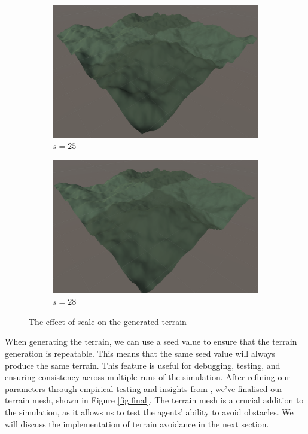 \documentclass[12pt]{article}
\begin{document}
\begin{figure}[ht]
    \centering
    \begin{subfigure}{0.45\textwidth}
        \centering
        \includegraphics[width=\linewidth]{scale25.png}
        \caption{$s=25$}
        \label{fig:scale25}
    \end{subfigure}
    \hfill
    \begin{subfigure}{0.45\textwidth}
        \centering
        \includegraphics[width=\linewidth]{scale28.png}
        \caption{$s=28$}
        \label{fig:scale28}
    \end{subfigure}
    \caption{The effect of scale on the generated terrain}
    \label{fig:scale}
\end{figure}

When generating the terrain, we can use a seed value to ensure that the terrain generation is repeatable. This means that the same seed value will always produce the same terrain. This feature is useful for debugging, testing, and ensuring consistency across multiple runs of the simulation. After refining our parameters through empirical testing and insights from \cite[pg.3-4]{Etherington}, we've finalised our terrain mesh, shown in Figure \ref{fig:final}. The terrain mesh is a crucial addition to the simulation, as it allows us to test the agents' ability to avoid obstacles. We will discuss the implementation of terrain avoidance in the next section.
\end{document}
